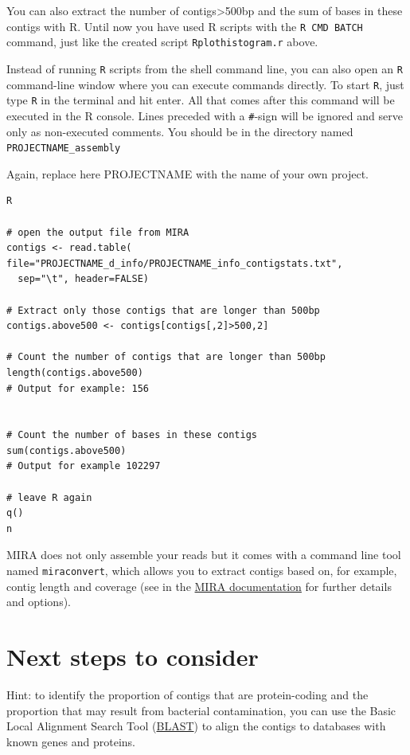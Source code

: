 \documentclass[11pt]{article}
\begin{document}
\clearpage




You can also extract the number of contigs>500bp and the sum of bases
in these contigs with R. Until now you have used R scripts with the \texttt{R
CMD BATCH} command, just like the created script \texttt{Rplothistogram.r}
above.

Instead of running \texttt{R} scripts from the shell command line, you can
also open an \texttt{R} command-line window where you can execute commands
directly. To start \texttt{R}, just type \texttt{R} in the terminal and hit
enter. All that comes after this command will be executed in the R
console. Lines preceded with a \texttt{\#}-sign will be ignored and serve only
as non-executed comments. You should be in the directory named
\texttt{PROJECTNAME\_assembly}

Again, replace here PROJECTNAME with the name of your own project.

\begin{verbatim}
R

# open the output file from MIRA
contigs <- read.table( 
file="PROJECTNAME_d_info/PROJECTNAME_info_contigstats.txt", 
  sep="\t", header=FALSE)

# Extract only those contigs that are longer than 500bp
contigs.above500 <- contigs[contigs[,2]>500,2]

# Count the number of contigs that are longer than 500bp
length(contigs.above500)
# Output for example: 156


# Count the number of bases in these contigs
sum(contigs.above500)
# Output for example 102297

# leave R again
q()
n
\end{verbatim}



MIRA does not only assemble your reads but it comes with a command
line tool named \texttt{miraconvert}, which allows you to extract contigs
based on, for example, contig length and coverage (see in the \href{http://mira-assembler.sourceforge.net/docs/DefinitiveGuideToMIRA.pdf}{MIRA documentation} for further details and options).




\section{Next steps to consider}
\label{sec-3}

Hint: to identify the proportion of contigs that are protein-coding
and the proportion that may result from bacterial contamination, you
can use the Basic Local Alignment Search Tool (\href{http://blast.ncbi.nlm.nih.gov/Blast.cgi}{BLAST}) to align the
contigs to databases with known genes and proteins.
\end{document}
